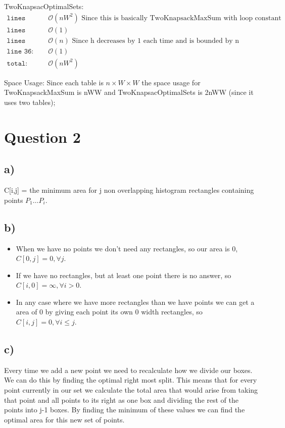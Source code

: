 \documentclass[12pt]{article}
\begin{document}
TwoKnapsacOptimalSets:\\
\begin{align*}
    \texttt{lines 2-36: } & \mathcal{O}(nW^2) \text{ Since this is basically TwoKnapsackMaxSum with loop constant increased}\\
    \texttt{lines 41-53:  } & \mathcal{O}(1)\\
    \texttt{lines 40-54} & \mathcal{O}(n) \text{ Since h decreases by 1 each time and is bounded by n}\\
    \texttt{line 36: } & \mathcal{O}(1)\\
    \texttt{total: } & \mathcal{O}(nW^2)
\end{align*}

Space Usage:
Since each table is $n \times W \times W$ the space usage for TwoKnapsackMaxSum is nWW and TwoKnapsacOptimalSets is 2nWW (since it uses two tables);

\section*{Question 2}
\subsection*{a)}
C[i,j] = the minimum area for j non overlapping histogram rectangles containing points $P_1 \dots P_i$.

\subsection*{b)}
\begin{itemize}
    \item When we have no points we don't need any rectangles, so our area is 0, $C[0,j] = 0, \forall j$.
    \item If we have no rectangles, but at least one point there is no answer, so $C[i,0] = \infty, \forall i>0$.
    \item In any case where we have more rectangles than we have points we can get a area of 0 by giving each point its own 0 width rectangles, so $C[i,j] = 0, \forall i\leq j$.
\end{itemize}

\subsection*{c)}
Every time we add a new point we need to recalculate how we divide our boxes. We can do this by finding the optimal right most split. This means that for every point currently in our set we calculate the total area that would arise from taking that point and all points to its right as one box and dividing the rest of the points into j-1 boxes. By finding the minimum of these values we can find the optimal area for this new set of points.
\end{document}
